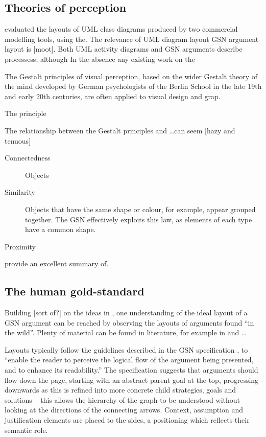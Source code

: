 \subsection{Theories of perception}

\citet{kennysun} evaluated the layouts of UML class diagrams produced by two commercial modelling tools, using the.
The relevance of UML diagram layout GSN argument layout is [moot]. Both UML activity diagrams and GSN arguments describe processess, although \citeauthor{kennysun}  In the absence any existing work on the 


The Gestalt principles of visual perception,
based on the wider Gestalt theory of the mind developed by German psychologists of the Berlin School in the late 19th and early 20th centuries,
are often applied to visual design and grap.

The principle 

The relationship between the Gestalt principles and \ldots can seem [hazy and tenuous]

\begin{description}
    \item[Connectedness] Objects 

    \item[Similarity] Objects that have the same shape or colour, for example, appear grouped together.
    The GSN effectively exploits this law, as elements of each type have a common shape.
    
    \item[Proximity]
    
\end{description}


\citeauthor{kennysun} provide an excellent summary of. 


\subsection{The human gold-standard }

Building [sort of?] on the ideas in \cite{5674033}, one understanding of the ideal layout of a GSN argument can be reached by observing the layouts of arguments found ``in the wild''.
Plenty of material can be found in literature, for example in \cite{Habli:2006:PPC:1183088.1183090} and  \cite{insilico} \ldots

Layouts typically follow the guidelines described in the GSN specification \citep[section~2.2, pp.~26--27]{gsnstandard}, 
to ``enable the reader to perceive the logical flow of the argument being presented, and to enhance its readability.''
The specification suggests that arguments should flow down the page, starting with an abstract parent goal at the top, progressing downwards as this is refined into more concrete child strategies, goals and solutions -- this allows the hierarchy of the graph to be understood without looking at the directions of the connecting arrows.
Context, assumption and justification elements are placed to the sides, a positioning which reflects their semantic role.

